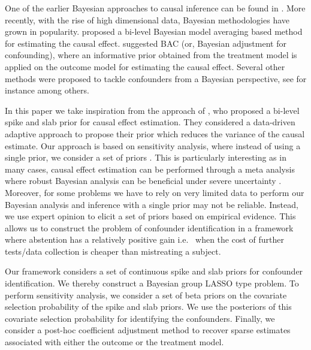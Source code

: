 \documentclass[preprint,12pt]{elsarticle}
\begin{document}
One of the earlier Bayesian approaches to causal inference
can be found in \citep{rubin1978}. More recently,
with the rise of high dimensional data,
Bayesian methodologies have grown in popularity.
 proposed a bi-level 
Bayesian model averaging based method for estimating the causal 
effect.  suggested BAC (or, Bayesian adjustment for
confounding),
where an informative prior obtained from
the treatment model is applied on the outcome model for
estimating the causal effect. Several other methods were
proposed to tackle confounders from a Bayesian perspective,
see for instance \citep{Zigler2014,Hahn2018} among others.

In this paper we take inspiration from the approach of \citet{koch2020}, who proposed a bi-level spike and slab prior for causal effect 
estimation. They considered a data-driven adaptive approach to
propose their prior which reduces the variance of the causal estimate. 
Our approach is based on
sensitivity analysis, where instead of using a single prior, 
we consider a set of priors \citep{BERGER1990303}. This is particularly 
interesting as in many cases, causal effect estimation can be performed 
through a meta analysis where robust Bayesian analysis 
can be beneficial under severe uncertainty \citep{raices_cruz22}.
Moreover, for some problems 
we have to rely on very limited data to perform our Bayesian analysis and 
inference with a single prior may not be reliable.
Instead, we use expert opinion to elicit a set of priors 
based on empirical evidence. 
This allows us to construct the problem of confounder identification 
in a framework where abstention has a relatively positive gain i.e.~
when the cost of further tests/data collection is cheaper than
mistreating a subject.

Our framework considers a set of continuous spike and slab priors 
\citep{ishwaran2005} for confounder identification.
We thereby construct a Bayesian group LASSO \citep{xu2015} type problem.
To perform sensitivity analysis,
we consider a set of beta priors on the covariate selection 
probability of the spike and slab priors. We use the posteriors of this
covariate selection probability for identifying the confounders. Finally, 
we consider a post-hoc coefficient adjustment method \citep{hahn2015}
to recover sparse estimates associated with either the outcome or the
treatment model. 
\end{document}

